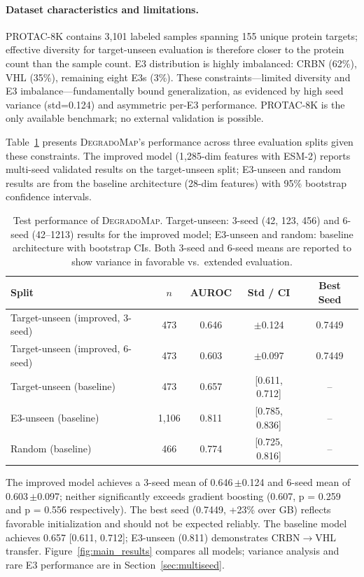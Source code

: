 \documentclass[sigconf]{acmart}
\newcommand{\ours}{\textsc{DegradoMap}}
\newcommand{\ci}[2]{{\small[#1, #2]}}
\newcommand{\spm}[1]{{\scriptsize$\pm$#1}}
\begin{document}
\paragraph{Dataset characteristics and limitations.}
PROTAC-8K contains 3,101 labeled samples spanning 155 unique protein targets; effective diversity for target-unseen evaluation is therefore closer to the protein count than the sample count.
E3 distribution is highly imbalanced: CRBN (62\%), VHL (35\%), remaining eight E3s (3\%).
These constraints---limited diversity and E3 imbalance---fundamentally bound generalization, as evidenced by high seed variance (std=0.124) and asymmetric per-E3 performance. PROTAC-8K is the only available benchmark; no external validation is possible.

Table~\ref{tab:main} presents \ours{}'s performance across three evaluation splits given these constraints.
The improved model (1,285-dim features with ESM-2) reports multi-seed validated results on the target-unseen split; E3-unseen and random results are from the baseline architecture (28-dim features) with 95\% bootstrap confidence intervals.

\begin{table}[!ht]
\centering
\caption{Test performance of \ours{}. Target-unseen: 3-seed (42, 123, 456) and 6-seed (42--1213) results for the improved model; E3-unseen and random: baseline architecture with bootstrap CIs. Both 3-seed and 6-seed means are reported to show variance in favorable vs.\ extended evaluation.}
\label{tab:main}
\scriptsize
\setlength{\tabcolsep}{3pt}
\begin{tabular}{@{}lcccc@{}}
\toprule
\textbf{Split} & $n$ & \textbf{AUROC} & \textbf{Std / CI} & \textbf{Best Seed} \\
\midrule
Target-unseen (improved, 3-seed) & 473 & 0.646 & \spm{0.124} & 0.7449 \\
Target-unseen (improved, 6-seed) & 473 & 0.603 & \spm{0.097} & 0.7449 \\
Target-unseen (baseline) & 473 & 0.657 & \ci{0.611}{0.712} & -- \\
E3-unseen (baseline)     & 1,106 & 0.811 & \ci{0.785}{0.836} & -- \\
Random (baseline)        & 466 & 0.774 & \ci{0.725}{0.816} & -- \\
\bottomrule
\end{tabular}
\end{table}

The improved model achieves a 3-seed mean of 0.646\,\spm{0.124} and 6-seed mean of 0.603\,\spm{0.097}; neither significantly exceeds gradient boosting (0.607, p = 0.259 and p = 0.556 respectively).
The best seed (0.7449, +23\% over GB) reflects favorable initialization and should not be expected reliably.
The baseline model achieves 0.657 \ci{0.611}{0.712}; E3-unseen (0.811) demonstrates CRBN$\to$VHL transfer.
Figure~\ref{fig:main_results} compares all models; variance analysis and rare E3 performance are in Section~\ref{sec:multiseed}.
\end{document}
